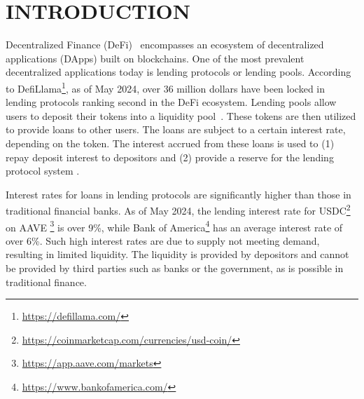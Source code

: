 \documentclass[../ICIT-Paper-2024.tex]{subfiles}
\begin{document}
\section{INTRODUCTION}\label{section1}

Decentralized Finance (DeFi)~\cite{werner2022sok} encompasses an ecosystem of decentralized applications (DApps) built on blockchains. One of the most prevalent decentralized applications today is lending protocols or lending pools. According to DefiLlama\footnote{\href{https://defillama.com/}{https://defillama.com/}}, as of May 2024, over 36 million dollars have been locked in lending protocols ranking second in the DeFi ecosystem. Lending pools allow users to deposit their tokens \cite{harvey2021defi} into a liquidity pool~\cite{sun2022liquidity}. These tokens are then utilized to provide loans to other users. The loans are subject to a certain interest rate, depending on the token. The interest accrued from these loans is used to (1) repay deposit interest to depositors and (2) provide a reserve for the lending protocol system \cite{Aave}.


Interest rates for loans in lending protocols are significantly higher than those in traditional financial banks. As of May 2024, the lending interest rate for USDC\footnote{\href{https://coinmarketcap.com/currencies/usd-coin/}{https://coinmarketcap.com/currencies/usd-coin/}} on AAVE \footnote{\href{https://app.aave.com/markets/}{https://app.aave.com/markets}} is over 9\%, while Bank of America\footnote{\href{https://www.bankofamerica.com/}{https://www.bankofamerica.com/}} has an average interest rate of over 6\%. Such high interest rates are due to supply not meeting demand, resulting in limited liquidity. The liquidity is provided by depositors and cannot be provided by third parties such as banks or the government, as is possible in traditional finance.
\end{document}
